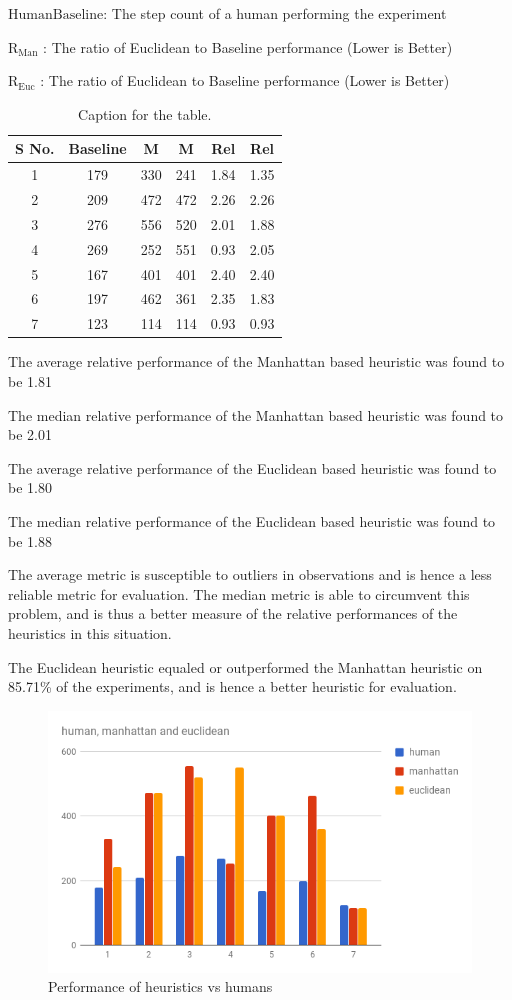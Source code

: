 $ \mathrm{Human Baseline} $: The step count of a human performing the experiment
 
$ \mathrm{R}_\mathrm{Man} $ : The ratio of Euclidean to Baseline performance (Lower is Better)
 
$ \mathrm{R}_\mathrm{Euc} $ : The ratio of Euclidean to Baseline performance (Lower is Better)

\begin{table}[h!]
  \centering
  \caption{Caption for the table.}
  \label{tab:table1}
  \begin{tabular}{cccccc}
    \toprule
      S No. & Baseline & M & M  & Rel & Rel\\
    \midrule
    	1 & 179 & 330 & 241 & 1.84 & 1.35\\
    	2 & 209 & 472 & 472 & 2.26 & 2.26\\
    	3 & 276 & 556 & 520 & 2.01 & 1.88\\
    	4 & 269 & 252 & 551 & 0.93 & 2.05\\
    	5 & 167 & 401 & 401 & 2.40 & 2.40\\
    	6 & 197 & 462 & 361 & 2.35 & 1.83\\
    	7 & 123 & 114 & 114 & 0.93 & 0.93\\
    \bottomrule
  \end{tabular}
\end{table}


The average relative performance of the Manhattan based heuristic was found to be 1.81

The median relative performance of the Manhattan based heuristic was found to be 2.01

The average relative performance of the Euclidean based heuristic was found to be 1.80

The median relative performance of the Euclidean based heuristic was found to be 1.88
 
The average metric is susceptible to outliers in observations and is hence a less reliable metric for evaluation. The median metric is able to circumvent this problem, and is thus a better measure of the relative performances of the heuristics in this situation.
  
The Euclidean heuristic equaled or outperformed the Manhattan heuristic on 85.71\% of the experiments, and is hence a better heuristic for evaluation.


\begin{figure}
  \includegraphics[width=\linewidth]{images/chart.png}
  \caption{Performance of heuristics vs humans}
  \label{fig:chart1}
\end{figure}